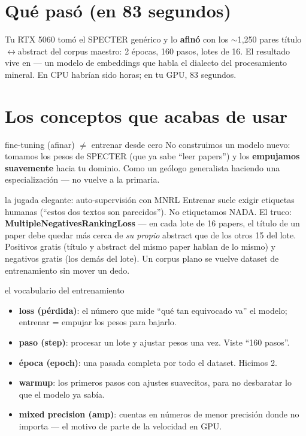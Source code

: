 \documentclass[11pt,a4paper]{article}
\begin{document}
\section{Qué pasó (en 83 segundos)}

Tu RTX 5060 tomó el SPECTER genérico y lo \textbf{afinó} con los $\sim$1,250 pares
título$\leftrightarrow$abstract del corpus maestro: 2 épocas, 160 pasos, lotes de 16.
El resultado vive en  — un modelo de embeddings que habla
el dialecto del procesamiento mineral. En CPU habrían sido horas; en tu GPU, 83 segundos.

\section{Los conceptos que acabas de usar}

\begin{concepto}{fine-tuning (afinar) $\neq$ entrenar desde cero}
No construimos un modelo nuevo: tomamos los pesos de SPECTER (que ya sabe ``leer papers'')
y los \textbf{empujamos suavemente} hacia tu dominio. Como un geólogo generalista haciendo
una especialización — no vuelve a la primaria.
\end{concepto}

\begin{concepto}{la jugada elegante: auto-supervisión con MNRL}
Entrenar suele exigir etiquetas humanas (``estos dos textos son parecidos''). No etiquetamos
NADA. El truco: \textbf{MultipleNegativesRankingLoss} — en cada lote de 16 papers, el título
de un paper debe quedar más cerca de \emph{su propio} abstract que de los otros 15 del lote.
Positivos gratis (título y abstract del mismo paper hablan de lo mismo) y negativos gratis
(los demás del lote). Un corpus plano se vuelve dataset de entrenamiento sin mover un dedo.
\end{concepto}

\begin{concepto}{el vocabulario del entrenamiento}
\begin{itemize}
  \item \textbf{loss (pérdida)}: el número que mide ``qué tan equivocado va'' el modelo;
        entrenar = empujar los pesos para bajarlo.
  \item \textbf{paso (step)}: procesar un lote y ajustar pesos una vez. Viste ``160 pasos''.
  \item \textbf{época (epoch)}: una pasada completa por todo el dataset. Hicimos 2.
  \item \textbf{warmup}: los primeros pasos con ajustes suavecitos, para no desbaratar lo
        que el modelo ya sabía.
  \item \textbf{mixed precision (amp)}: cuentas en números de menor precisión donde no
        importa — el motivo de parte de la velocidad en GPU.
\end{itemize}
\end{concepto}
\end{document}
